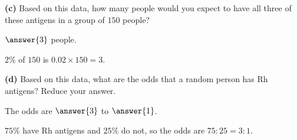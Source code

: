 \documentclass[12pt]{ximera}
\begin{document}
\begin{problem}
\begin{prompt}
\textbf{(c)} Based on this data, how many people would you expect to have all three of
these antigens in a group of $150$ people?

$\answer{3}$ people.

\begin{feedback}
$2\%$ of $150$ is $0.02\times 150=3$.
\end{feedback}
\end{prompt}

\begin{prompt}
\textbf{(d)} Based on this data, what are the odds that a random person has Rh
antigens? Reduce your answer.

The odds are $\answer{3}$ to $\answer{1}$.

\begin{feedback}
$75\%$ have Rh antigens and $25\%$ do not, so the odds are $75:25=3:1$.
\end{feedback}
\end{prompt}
\end{problem}
\end{document}
